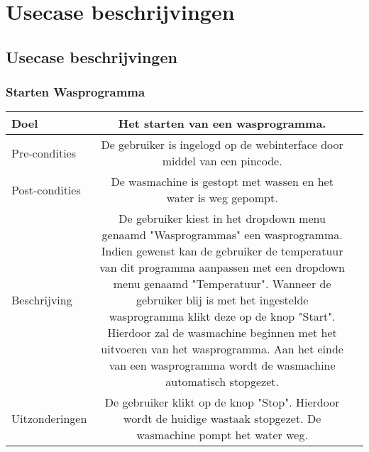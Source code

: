 \chapter{Usecase beschrijvingen}
\section{Usecase beschrijvingen}

\subsection{Starten Wasprogramma}

\begin{center}
  \begin{tabular}{ l | c | r | }
    \hline
    Doel & Het starten van een wasprogramma. \\ \hline
    Pre-condities & De gebruiker is ingelogd op de webinterface door middel van een pincode. \\ \hline
    Post-condities & De wasmachine is gestopt met wassen en het water is weg gepompt. \\ \hline
    Beschrijving & De gebruiker kiest in het dropdown menu genaamd "Wasprogrammas" een wasprogramma. Indien gewenst kan de gebruiker de temperatuur van dit programma aanpassen met een dropdown menu genaamd "Temperatuur". Wanneer de gebruiker blij is met het ingestelde wasprogramma klikt deze op de knop "Start". Hierdoor zal de wasmachine beginnen met het uitvoeren van het wasprogramma. Aan het einde van een wasprogramma wordt de wasmachine automatisch stopgezet.\\ \hline
	Uitzonderingen & De gebruiker klikt op de knop "Stop". Hierdoor wordt de huidige wastaak stopgezet. De wasmachine pompt het water weg. \\
    \hline
  \end{tabular}
\end{center}
